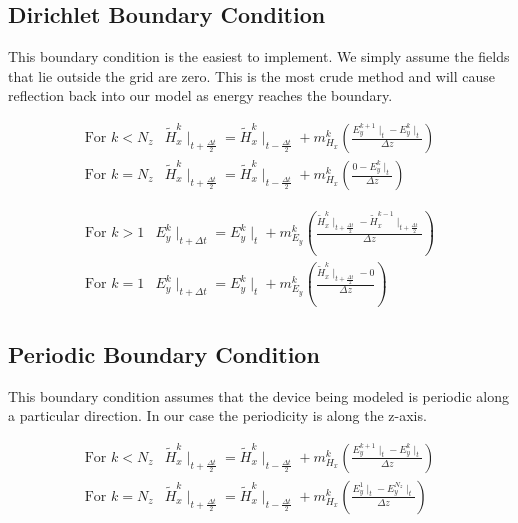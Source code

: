 \documentclass[a4paper,10pt]{article}
\begin{document}
\subsection{Dirichlet Boundary Condition}
This boundary condition is the easiest to implement.  We simply assume the fields that lie outside the grid are zero.  This is the most crude method and will cause reflection back into our model as energy reaches the boundary.


\begin{eqnarray*}
  \mbox{For } k < N_z & \tilde{H}_{x}^{k}\mid_{t+\frac{\Delta t}{2}} = \tilde{H}_{x}^{k}\mid_{t-\frac{\Delta t}{2}} + m_{H_x}^{k}\left(\frac{E_{y}^{k+1}\mid_{t} - E_{y}^{k}\mid_{t}}{\Delta z}\right) \\
  \mbox{For } k = N_z & \tilde{H}_{x}^{k}\mid_{t+\frac{\Delta t}{2}} = \tilde{H}_{x}^{k}\mid_{t-\frac{\Delta t}{2}} + m_{H_x}^{k}\left(\frac{0 - E_{y}^{k}\mid_{t}}{\Delta z}\right)
\end{eqnarray*}



\begin{eqnarray*}
  \mbox{For } k > 1 & E_{y}^{k}\mid_{t+\Delta t} = E_{y}^{k}\mid_{t} + m_{E_y}^{k}\left(\frac{\tilde{H}_{x}^{k}\mid_{t+\frac{\Delta t}{2}} - \tilde{H}_{x}^{k-1}\mid_{t+\frac  {\Delta t}{2}}}{\Delta z}\right)\\
  \mbox{For } k = 1 & E_{y}^{k}\mid_{t+\Delta t} = E_{y}^{k}\mid_{t} + m_{E_y}^{k}\left(\frac{\tilde{H}_{x}^{k}\mid_{t+\frac{\Delta t}{2}} - 0}{\Delta z}\right)
\end{eqnarray*}

\subsection{Periodic Boundary Condition}
This boundary condition assumes that the device being modeled is periodic along a particular direction.  In our case the periodicity is along the z-axis. 

\begin{eqnarray*}
  \mbox{For } k < N_z & \tilde{H}_{x}^{k}\mid_{t+\frac{\Delta t}{2}} = \tilde{H}_{x}^{k}\mid_{t-\frac{\Delta t}{2}} + m_{H_x}^{k}\left(\frac{E_{y}^{k+1}\mid_{t} - E_{y}^{k}\mid_{t}}{\Delta z}\right)\\
  \mbox{For } k = N_z & \tilde{H}_{x}^{k}\mid_{t+\frac{\Delta t}{2}} = \tilde{H}_{x}^{k}\mid_{t-\frac{\Delta t}{2}} + m_{H_x}^{k}\left(\frac{E_{y}^{1}\mid_{t} - E_{y}^{N_z}\mid_{t}}{\Delta z}\right)
\end{eqnarray*}
\end{document}
